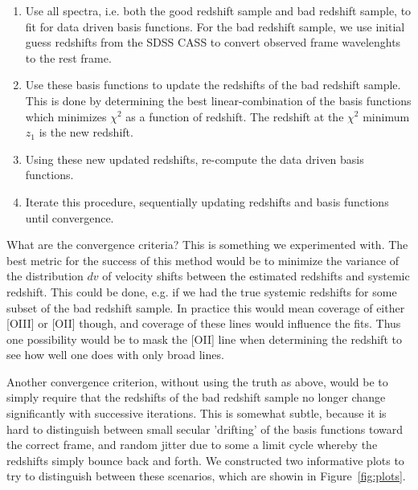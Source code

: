 \documentclass[apj]{emulateapj}
\begin{document}
\begin{enumerate}
\item{} Use all spectra, i.e. both the good redshift sample and bad
  redshift sample, to fit for data driven basis functions.  For the
  bad redshift sample, we use initial guess redshifts from the SDSS
  CASS to convert observed frame wavelenghts to the rest frame.

\item{} Use these basis functions to update the redshifts of the bad
redshift sample. This is done by determining the best linear-combination
of the basis functions which minimizes $\chi^2$ as a function of redshift. The
redshift at the $\chi^2$ minimum $z_{1}$ is the new redshift. 

\item{} Using these new updated redshifts, re-compute the data driven basis
functions. 

\item{} Iterate this procedure, sequentially updating redshifts and basis
functions until convergence. 
\end{enumerate}

What are the convergence criteria? This is something we experimented with. The
best metric for the success of this method would be to minimize the variance
of the distribution $dv$ of velocity shifts between the estimated redshifts
and systemic redshift. This could be done, e.g. if we had the true systemic
redshifts for some subset of the bad redshift sample. In practice this would
mean coverage of either [OIII] or [OII] though, and coverage of these lines
would influence the fits. Thus one possibility would be to mask the [OII] line
when determining the redshift to see how well one does with only broad lines. 

Another convergence criterion, without using the truth as above, would
be to simply require that the redshifts of the bad redshift sample no 
longer change significantly with successive iterations. This is somewhat
subtle, because it is hard to distinguish between small secular 'drifting' of 
the basis functions toward the correct frame, and random jitter due to some
a limit cycle whereby the redshifts simply bounce back and forth. We
constructed two informative plots to try to distinguish between these
scenarios, which are showin in Figure~\ref{fig:plots}. 
\end{document}
